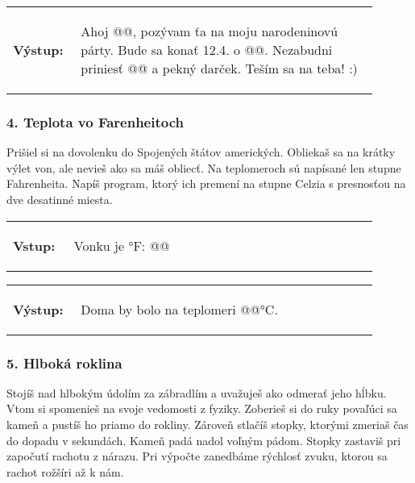\vspace{-2em}
\begin{tabular}{@{}p{0.15\linewidth}p{0.75\linewidth}}
\textbf{\small Výstup:} &
\vspace{-3em} 
\begin{code}
Ahoj @\fbox{\phantom{vstup}}@,
pozývam ťa na moju narodeninovú párty.
Bude sa konať 12.4. o @\fbox{\phantom{vstup}}@. 
Nezabudni priniesť @\fbox{\phantom{vstup}}@ a pekný darček.
Teším sa na teba! :)
\end{code}
\end{tabular}
\vspace{-2em}

\subsubsection*{4. Teplota vo Farenheitoch}
Prišiel si na dovolenku do Spojených štátov amerických. Obliekaš sa na krátky výlet von, ale nevieš ako sa máš obliecť. Na teplomeroch sú napísané len stupne Fahrenheita. Napíš program, ktorý ich premení na stupne Celzia s presnosťou na dve desatinné miesta.

\begin{tabular}{@{}p{0.15\linewidth}p{0.75\linewidth}}
\textbf{\small Vstup:} &
\vspace{-3em}
\begin{code}
Vonku je °F: @\fbox{\phantom{vstup}}@
\end{code}
\end{tabular}

\vspace{-2em}
\begin{tabular}{@{}p{0.15\linewidth}p{0.75\linewidth}}
\textbf{\small Výstup:} &
\vspace{-3em} 
\begin{code}
Doma by bolo na teplomeri @\fbox{\phantom{vstup}}@°C.
\end{code}
\end{tabular}
\vspace{-2em}

\subsubsection*{5. Hlboká roklina}
Stojíš nad hlbokým údolím za zábradlím a uvažuješ ako odmerať jeho hĺbku. Vtom si spomenieš na svoje vedomosti z fyziky. Zoberieš si do ruky povaľúci sa kameň a pustíš ho priamo do rokliny. Zároveň stlačíš stopky, ktorými zmeriaš čas do dopadu v sekundách. Kameň padá nadol voľným pádom. Stopky zastaviš pri započutí rachotu z nárazu. Pri výpočte zanedbáme rýchlosť zvuku, ktorou sa rachot rožšíri až k nám.

